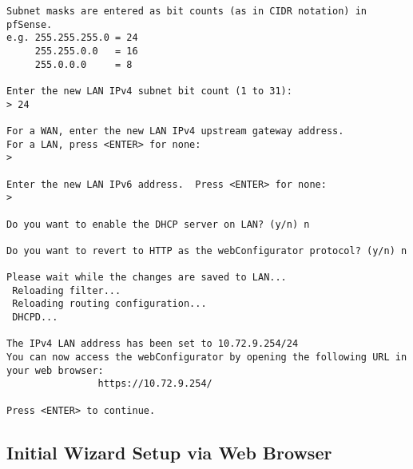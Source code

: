 \begin{enumerate}
\begin{verbatim}
Subnet masks are entered as bit counts (as in CIDR notation) in pfSense.
e.g. 255.255.255.0 = 24
     255.255.0.0   = 16
     255.0.0.0     = 8

Enter the new LAN IPv4 subnet bit count (1 to 31):
> 24

For a WAN, enter the new LAN IPv4 upstream gateway address.
For a LAN, press <ENTER> for none:
> 

Enter the new LAN IPv6 address.  Press <ENTER> for none:
> 

Do you want to enable the DHCP server on LAN? (y/n) n

Do you want to revert to HTTP as the webConfigurator protocol? (y/n) n

Please wait while the changes are saved to LAN...
 Reloading filter...
 Reloading routing configuration...
 DHCPD...

The IPv4 LAN address has been set to 10.72.9.254/24
You can now access the webConfigurator by opening the following URL in your web browser:
                https://10.72.9.254/

Press <ENTER> to continue.
\end{verbatim}
\end{enumerate}

\subsection{Initial Wizard Setup via Web Browser}

